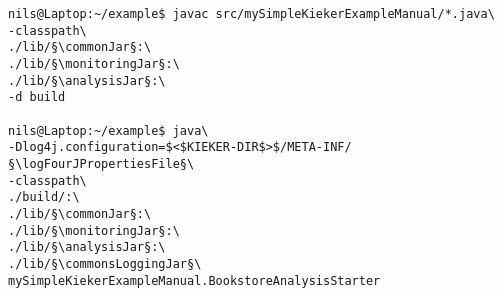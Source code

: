\begin{lstlisting} 			
nils@Laptop:~/example$ javac src/mySimpleKiekerExampleManual/*.java\
-classpath\ 		
./lib/§\commonJar§:\
./lib/§\monitoringJar§:\
./lib/§\analysisJar§:\
-d build

nils@Laptop:~/example$ java\
-Dlog4j.configuration=$<$KIEKER-DIR$>$/META-INF/§\logFourJPropertiesFile§\
-classpath\ 	
./build/:\
./lib/§\commonJar§:\
./lib/§\monitoringJar§:\
./lib/§\analysisJar§:\
./lib/§\commonsLoggingJar§\
mySimpleKiekerExampleManual.BookstoreAnalysisStarter 
\end{lstlisting}	
